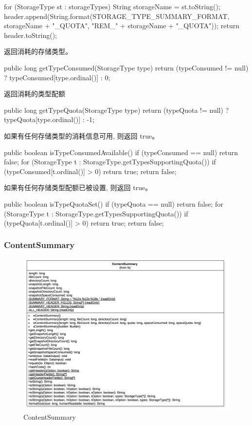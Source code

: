 \begin{java}
\begin{java}
{  for (StorageType st : storageTypes) {
    String storageName = st.toString();
    header.append(String.format(STORAGE_TYPE_SUMMARY_FORMAT,
        storageName + "_QUOTA", "REM_" + storageName + "_QUOTA"));
  }
  return header.toString();
}
\end{java}
返回消耗的存储类型。
\begin{java}
public long getTypeConsumed(StorageType type) {
  return (typeConsumed != null) ? typeConsumed[type.ordinal()] : 0;
}
\end{java}
返回消耗的类型配额
\begin{java}
public long getTypeQuota(StorageType type) {
  return (typeQuota != null) ? typeQuota[type.ordinal()] : -1;
}
\end{java}
如果有任何存储类型的消耗信息可用, 则返回 true。
\begin{java}
public boolean isTypeConsumedAvailable() {
  if (typeConsumed == null) {
    return false;
  }
  for (StorageType t : StorageType.getTypesSupportingQuota()) {
    if (typeConsumed[t.ordinal()] > 0) {
      return true;
    }
  }
  return false;
}
\end{java}
如果有任何存储类型配额已被设置, 则返回 true。
\begin{java}
public boolean isTypeQuotaSet() {
  if (typeQuota == null) {
    return false;
  }
  for (StorageType t : StorageType.getTypesSupportingQuota()) {
    if (typeQuota[t.ordinal()] > 0) {
      return true;
    }
  }
  return false;
}
\end{java}


\subsubsection{ContentSummary}

\begin{figure}
\centering
\includegraphics[width =1\linewidth]{uml/outputstream/9.png}
\caption{ContentSummary}
\label{fig:ContentSummary}
\end{figure}


\end{java}

